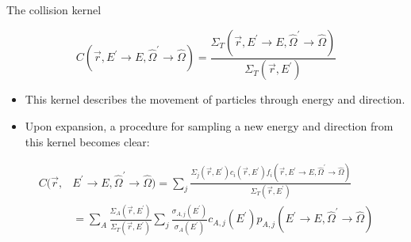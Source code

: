 \documentclass{beamer}
\begin{document}
\begin{frame}{The collision kernel}

  \begin{equation*}
    C(\vec{r},E^{'} \to E, \hat{\Omega}^{'} \to \hat{\Omega}) =
    \frac{\Sigma_T(\vec{r},E^{'} \to E,\hat{\Omega}^{'} \to \hat{\Omega})}
         {\Sigma_T(\vec{r},E^{'})}
  \end{equation*}

  \begin{itemize}
    \item This kernel describes the movement of particles through energy
      and direction.
    \item Upon expansion, a procedure for sampling a new energy and direction
      from this kernel becomes clear:
  \end{itemize}

  \begin{align}
    C(\vec{r},&E^{'} \to E, \hat{\Omega}^{'} \to \hat{\Omega}) =
    \sum_j \frac{\Sigma_j(\vec{r},E^{'})c_i(\vec{r},E^{'})
      f_i(\vec{r},E^{'} \to E,\hat{\Omega}^{'} \to \hat{\Omega})}
        {\Sigma_T(\vec{r},E^{'})} \nonumber \\
      & = \sum_A \frac{\Sigma_A(\vec{r},E^{'})}{\Sigma_T(\vec{r},E^{'})}
        \sum_j \frac{\sigma_{A,j}(E^{'})}{\sigma_A(E^{'})} c_{A,j}(E^{'})
        p_{A,j}(E^{'} \to E,\hat{\Omega}^{'} \to \hat{\Omega}) \nonumber
  \end{align}

\end{frame}
\end{document}
